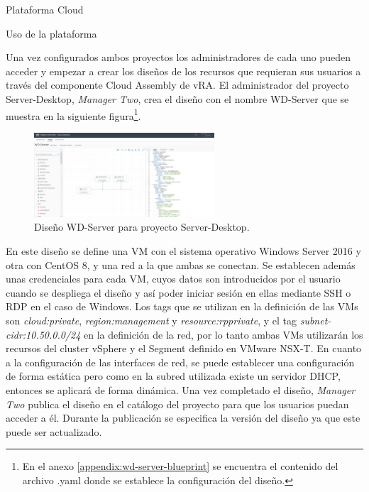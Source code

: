 \begin{subsection}{Plataforma Cloud}
\begin{subsubsection}{Uso de la plataforma}
        
        Una vez configurados ambos proyectos los administradores de cada uno pueden acceder y empezar a crear los diseños de los recursos que requieran sus usuarios a través del componente Cloud Assembly de vRA. El administrador del proyecto Server-Desktop, \textit{Manager Two}, crea el diseño con el nombre WD-Server que se muestra en la siguiente figura\footnote{En el anexo \ref{appendix:wd-server-blueprint} se encuentra el contenido del archivo .yaml donde se establece la configuración del diseño.}.
        \begin{figure}[h]
            \centering
            \includegraphics[width=0.6\textwidth]{imaxes/pruebaconcepto/vrealize/windows-centos-blueprint.png}
            \caption{Diseño WD-Server para proyecto Server-Desktop.}
            \label{fig:server-desktop-blueprint}
        \end{figure}
        \FloatBarrier
        En este diseño se define una VM con el sistema operativo Windows Server 2016 y otra con CentOS 8, y una red a la que ambas se conectan. Se establecen además unas credenciales para cada VM, cuyos datos son introducidos por el usuario cuando se despliega el diseño y así poder iniciar sesión en ellas mediante SSH o RDP en el caso de Windows. Los tags que se utilizan en la definición de las VMs son \textit{cloud:private}, \textit{region:management} y \textit{resource:rpprivate}, y el tag \textit{subnet-cidr:10.50.0.0/24} en la definición de la red, por lo tanto ambas VMs utilizarán los recursos del cluster vSphere y el Segment definido en VMware NSX-T. En cuanto a la configuración de las interfaces de red, se puede establecer una configuración de forma estática pero como en la subred utilizada existe un servidor DHCP, entonces se aplicará de forma dinámica. Una vez completado el diseño, \textit{Manager Two} publica el diseño en el catálogo del proyecto para que los usuarios puedan acceder a él. Durante la publicación se especifica la versión del diseño ya que este puede ser actualizado.

\end{subsubsection}
\end{subsection}
